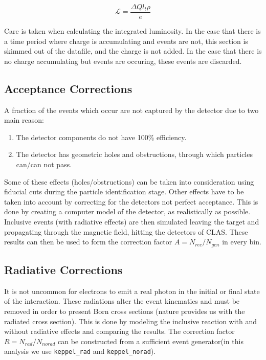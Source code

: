 \begin{equation}
  \mathcal{L} = \frac{\Delta Q l_t \rho}{e}
\end{equation}

Care is taken when calculating the integrated luminosity.  In the case that there is a time period where charge is accumulating and events are not, this section is skimmed out of the datafile, and the charge is not added.  In the case that there is no charge accumulating but events are occuring, these events are discarded. 


\subsection{Acceptance Corrections}
A fraction of the events which occur are not captured by the detector due to two main reason: 

\begin{enumerate}
  \item The detector components do not have 100\% efficiency.
  \item The detector has geometric holes and obstructions, through which particles can/can not pass.
\end{enumerate}

Some of these effects (holes/obstructions) can be taken into consideration using fiducial cuts during the particle identification stage.  Other effects  have to be taken into account by correcting for the detectors not perfect acceptance.  This is done by creating a computer model of the detector, as realistically as possible.  Inclusive events (with radiative effects) are then simulated leaving the target and propagating through the magnetic field, hitting the detectors of CLAS.  These results can then be used to form the correction factor $A = N_{rec}/N_{gen}$ in every bin.  

\subsection{Radiative Corrections}
It is not uncommon for electrons to emit a real photon in the initial or final state of the interaction.  These radiations alter the event kinematics and must be removed in order to present Born cross sections (nature provides us with the radiated cross section).  This is done by modeling the inclusive reaction with and without radiative effects and comparing the results.  The correction factor $R = N_{rad}/N_{no rad}$ can be constructed from a sufficient event generator(in this analysis we use \texttt{keppel\_rad} and \texttt{keppel\_norad}).  


